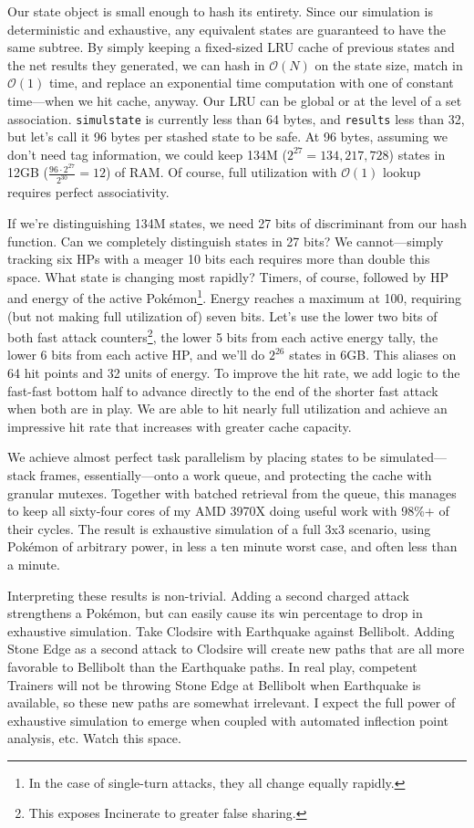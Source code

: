Our state object is small enough to hash its entirety.
Since our simulation is deterministic and exhaustive, any equivalent states
 are guaranteed to have the same subtree.
By simply keeping a fixed-sized LRU cache of previous states and the net results they
 generated, we can hash in $\mathcal{O}(N)$ on the state size, match in $\mathcal{O}(1)$
 time, and replace an exponential time computation with one of constant time---when we hit cache, anyway.
Our LRU can be global or at the level of a set association.
\texttt{simulstate} is currently less than 64 bytes, and \texttt{results} less than 32, but
 let's call it 96 bytes per stashed state to be safe.
At 96 bytes, assuming we don't need tag information, we could keep 134M ($2^{27} = 134,217,728$) states
 in 12GB ($\frac{96\cdot2^{27}}{2^{30}} = 12$) of RAM\@.
Of course, full utilization with $\mathcal{O}(1)$ lookup requires perfect associativity.

If we're distinguishing 134M states, we need 27 bits of discriminant from our hash function.
Can we completely distinguish states in 27 bits?
We cannot---simply tracking six HPs with a meager 10 bits each requires more than double this space.
What state is changing most rapidly?
Timers, of course, followed by HP and energy of the active Pokémon\footnote{In the case of single-turn attacks, they all change equally rapidly.}.
Energy reaches a maximum at 100, requiring (but not making full utilization of) seven bits.
Let's use the lower two bits of both fast attack counters\footnote{This exposes Incinerate to greater false sharing.},
 the lower 5 bits from each active energy tally, the lower 6 bits from each
 active HP, and we'll do $2^{26}$ states in 6GB\@.
This aliases on 64 hit points and 32 units of energy.
To improve the hit rate, we add logic to the fast-fast bottom half to advance directly
 to the end of the shorter fast attack when both are in play.
We are able to hit nearly full utilization and achieve an impressive hit rate that
 increases with greater cache capacity.

We achieve almost perfect task parallelism by placing states to be simulated---stack frames,
 essentially---onto a work queue, and protecting the cache with granular mutexes.
Together with batched retrieval from the queue, this manages to keep all sixty-four
 cores of my AMD 3970X doing useful work with 98\%+ of their cycles.
The result is exhaustive simulation of a full 3x3 scenario, using Pokémon of arbitrary power,
 in less a ten minute worst case, and often less than a minute.

Interpreting these results is non-trivial.
Adding a second charged attack strengthens a Pokémon, but can easily cause its
 win percentage to drop in exhaustive simulation.
Take Clodsire with Earthquake against Bellibolt.
Adding Stone Edge as a second attack to Clodsire will create new paths that are all
 more favorable to Bellibolt than the Earthquake paths.
In real play, competent Trainers will not be throwing Stone Edge at Bellibolt when Earthquake is available,
 so these new paths are somewhat irrelevant.
I expect the full power of exhaustive simulation to emerge when coupled with automated
 inflection point analysis, etc.
Watch this space.

